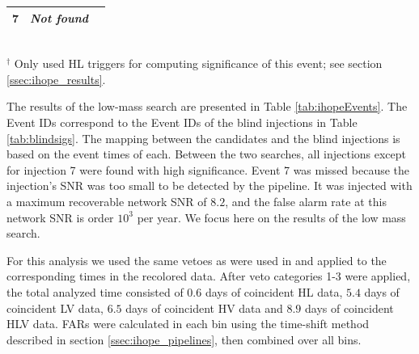 \begin{table}
\begin{tabular}{@{}ccccccccc}
     \hline
    7 & \multicolumn{7}{c}{\it{Not found}}  \\ 
     \hline
\end{tabular}
\\
$^\dagger$ Only used HL triggers for computing significance of
this event; see section \ref{ssec:ihope_results}.

\end{table}

The results of the low-mass \ihope{} search are presented in
Table \ref{tab:ihopeEvents}. The Event IDs correspond to the Event IDs of the
blind injections in Table \ref{tab:blindsigs}. The mapping between the \ihope{}
candidates and the blind injections is based on the event times of each. 
Between the two \ihope{} searches, all injections except for injection 7 were 
found with high significance. Event 7 was missed because the injection's SNR was
too small to be detected by the pipeline. 
It was injected with a maximum recoverable network SNR of $8.2$, and the false alarm 
rate at this network SNR is order $10^3$ per year.
We focus here on the results of the low mass search.

For this analysis we used the same vetoes as were used in
\cite{Colaboration:2011np} and \cite{Aasi:2012rja} applied to
the corresponding times in the recolored data. After veto categories
1-3 were applied, the total analyzed time consisted of $0.6$ days of
coincident HL data, $5.4$ days of coincident LV data, $6.5$ days of
coincident HV data and $8.9$ days of coincident HLV data.  FARs were
calculated in each bin using the time-shift method described in
section \ref{ssec:ihope_pipelines}, then combined over all bins.

